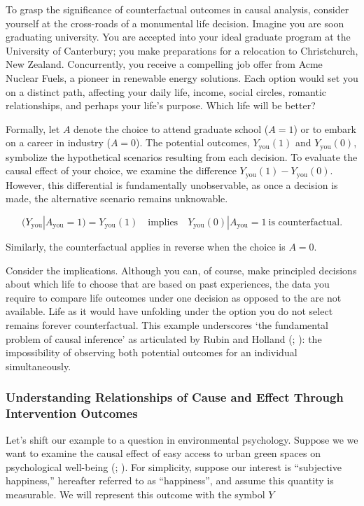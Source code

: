 \documentclass[
  singlecolumn]{article}
\begin{document}
To grasp the significance of counterfactual outcomes in causal analysis,
consider yourself at the cross-roads of a monumental life decision.
Imagine you are soon graduating university. You are accepted into your
ideal graduate program at the University of Canterbury; you make
preparations for a relocation to Christchurch, New Zealand.
Concurrently, you receive a compelling job offer from Acme Nuclear
Fuels, a pioneer in renewable energy solutions. Each option would set
you on a distinct path, affecting your daily life, income, social
circles, romantic relationships, and perhaps your life's purpose. Which
life will be better?

Formally, let \(A\) denote the choice to attend graduate school
(\(A = 1\)) or to embark on a career in industry (\(A = 0\)). The
potential outcomes, \(Y_{\text{you}}(1)\) and \(Y_{\text{you}}(0)\),
symbolize the hypothetical scenarios resulting from each decision. To
evaluate the causal effect of your choice, we examine the difference
\(Y_{\text{you}}(1) - Y_{\text{you}}(0)\). However, this differential is
fundamentally unobservable, as once a decision is made, the alternative
scenario remains unknowable.

\[
(Y_{\text{you}}|A_{\text{you}} = 1) = Y_{\text{you}}(1) \quad \text{implies} \quad Y_{\text{you}}(0)|A_{\text{you}} = 1~ \text{is counterfactual}.
\]

Similarly, the counterfactual applies in reverse when the choice is
\(A = 0\).

Consider the implications. Although you can, of course, make principled
decisions about which life to choose that are based on past experiences,
the data you require to compare life outcomes under one decision as
opposed to the are not available. Life as it would have unfolding under
the option you do not select remains forever counterfactual. This
example underscores `the fundamental problem of causal inference' as
articulated by Rubin and Holland (; ): the impossibility of
observing both potential outcomes for an individual simultaneously.

\subsubsection{Understanding Relationships of Cause and Effect Through
Intervention
Outcomes}\label{understanding-relationships-of-cause-and-effect-through-intervention-outcomes}

Let's shift our example to a question in environmental psychology.
Suppose we we want to examine the causal effect of easy access to urban
green spaces on psychological well-being
(;
). For
simplicity, suppose our interest is ``subjective happiness,'' hereafter
referred to as ``happiness'', and assume this quantity is measurable. We
will represent this outcome with the symbol \(Y\)
\end{document}
